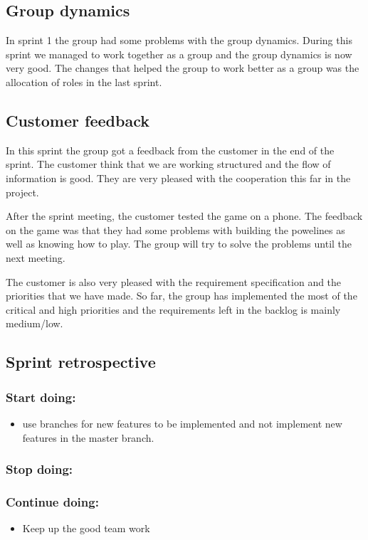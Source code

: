 \subsection{Group dynamics}
	In sprint 1 the group had some problems with the group dynamics. 
	During this sprint we managed to work together as a group and the group dynamics
	is now very good. The changes that helped the group to work better as a group
	was the allocation of roles in the last sprint. 

\subsection{Customer feedback}
	In this sprint the group got a feedback from the customer in the end of the sprint.
	The customer think that we are working structured and the flow of information is good.
	They are very pleased with the cooperation this far in the project.

	After the sprint meeting, the customer tested the game on a phone. The feedback on the game
	was that they had some problems with building the powelines as well as knowing how to play.
	The group will try to solve the problems until the next meeting.

	The customer is also very pleased with the requirement specification and the priorities
	that we have made. So far, the group has implemented the most of the critical and high
	priorities and the requirements left in the backlog is mainly medium/low. 

\subsection{Sprint retrospective}
	\subsubsection*{Start doing: } 
		\begin{itemize}
			\item use branches for new features to be implemented and not implement new 
			features in the master branch.
		\end{itemize}
	\subsubsection*{Stop doing: }

	\subsubsection*{Continue doing: }
		\begin{itemize}
			\item Keep up the good team work
		\end{itemize}

